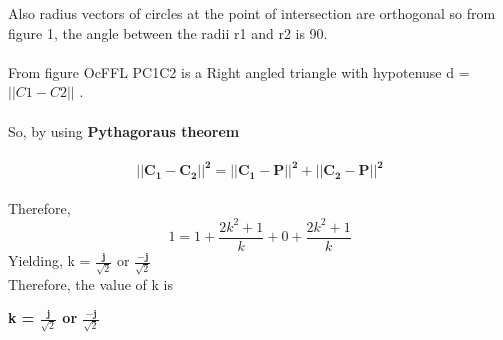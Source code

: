 \documentclass[journal,12pt,twocolumn]{IEEEtran}
\let\vec\mathbf
\newlength\triwidth
\newcommand\tridelt[1]{%
  \setlength\triwidth{\widthof{#1\ }}%
  \stackengine{-.1\triwidth}{#1\ }%
    {\scaleto{\Delta}{1\triwidth}}{O}{c}{F}{F}{L}%
}
\begin{document}
Also radius vectors of circles at the point of intersection are orthogonal so from figure 1, the angle between the radii r1 and r2 is 90\textdegree.  \\
\\
From figure \tridelt.PC1C2 is a Right angled triangle with hypotenuse d = $||C1-C2||$ .  \\
\\
So, by using \textbf{Pythagoraus theorem}  \\
\\
\begin{equation}
    \vec{||C_1 - C_2||^2 = ||C_1 - P||^2+||C_2 - P||^2}
\end{equation}
\\
Therefore,\\
\begin{equation}
    1 = 1+ \frac{2k^2 + 1}{k} + 0 + \frac{2k^2 + 1}{k}
\end{equation}
Yielding, k = $\frac{\vec{j}}{\sqrt{2}}$ or $\frac{-\vec{j}}{\sqrt{2}}$ \\
Therefore, the value of k is \\
\begin{center}
    \textbf{k = $\frac{\vec{j}}{\sqrt{2}}$ or $\frac{-\vec{j}}{\sqrt{2}}$}\\
\end{center}
\end{document}
